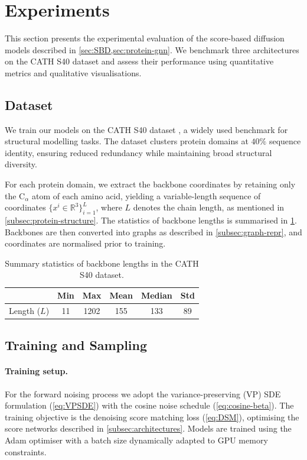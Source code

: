 \documentclass[a4paper,12pt]{article}
\begin{document}
\clearpage

\section{Experiments}\label{sec:Experiments}
This section presents the experimental evaluation of the score-based diffusion models described in \cref{sec:SBD,sec:protein-gnn}. We benchmark three architectures on the CATH S40 dataset and assess their performance using quantitative metrics and qualitative visualisations. 

\subsection{Dataset}\label{subsec:dataset}
We train our models on the CATH S40 dataset \citep{orengo1997CATHHierarchicClassification,waman2024CATH2024CATHAlphaFlow,sillitoe2021CATHIncreasedStructural,lewis2018Gene3DExtensivePrediction}, a widely used benchmark for structural modelling tasks. The dataset clusters protein domains at \(40\%\) sequence identity, ensuring reduced redundancy while maintaining broad structural diversity. 

For each protein domain, we extract the backbone coordinates by retaining only the C\(_\alpha\) atom of each amino acid, yielding a variable-length sequence of coordinates \(\{x^i \in \mathbb{R}^3\}_{i=1}^L\), where \(L\) denotes the chain length, as mentioned in \cref{subsec:protein-structure}. The statistics of backbone lengths is summarised in \cref{tab:cath-stats}. Backbones are then converted into graphs as described in \cref{subsec:graph-repr}, and coordinates are normalised prior to training.

\begin{table}[htbp]
    \centering
    \caption{Summary statistics of backbone lengths in the CATH S40 dataset.}
    \label{tab:cath-stats}
    \begin{tabular}{lccccc}
        \toprule
        & Min & Max & Mean & Median & Std \\
        \midrule
        Length (\(L\)) & 11 & 1202 & 155 & 133 & 89 \\
        \bottomrule
    \end{tabular}
\end{table}

\subsection{Training and Sampling}
\paragraph{Training setup.}
For the forward noising process we adopt the variance-preserving (VP) SDE formulation (\cref{eq:VPSDE}) with the cosine noise schedule (\cref{eq:cosine-beta}). The training objective is the denoising score matching loss (\cref{eq:DSM}), optimising the score networks described in \cref{subsec:architectures}. Models are trained using the Adam optimiser \citep{kingma2017AdamMethodStochastic} with a batch size dynamically adapted to GPU memory constraints.
\end{document}
